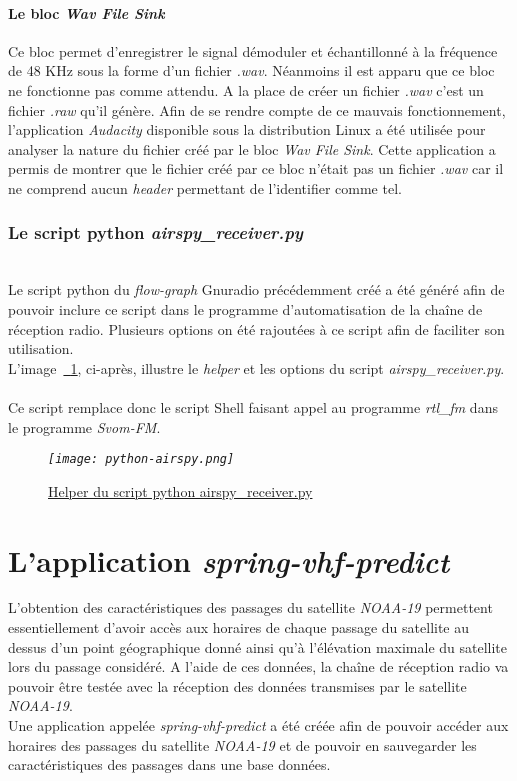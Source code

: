 \documentclass[12pt,fleqn]{book} %
\begin{document}
\subsubsection{Le bloc \emph{Wav File Sink}}
\noindent Ce bloc permet d'enregistrer le signal démoduler et échantillonné à la fréquence de 48 KHz sous la forme d'un fichier \emph{.wav}. Néanmoins il est apparu que ce bloc ne fonctionne pas comme attendu. A la place de créer un fichier \emph{.wav} c'est un fichier \emph{.raw} qu'il génère. Afin de se rendre compte de ce mauvais fonctionnement, l'application \emph{Audacity} disponible sous la distribution Linux a été utilisée pour analyser la nature du fichier créé par le bloc \emph{Wav File Sink}. Cette application a permis de montrer que le fichier créé par ce bloc n'était pas un fichier \emph{.wav} car il ne comprend aucun \emph{header} permettant de l'identifier comme tel.
\subsection{Le script python \emph{airspy\_receiver.py}}
~\\\indent Le script python du \emph{flow-graph} Gnuradio précédemment créé a été généré afin de pouvoir inclure ce script dans le programme d'automatisation de la chaîne de réception radio. Plusieurs options on été rajoutées à ce script afin de faciliter son utilisation.
~\\L'image~\underline{\color{blue}~\ref{python-airspy}}, ci-après, illustre le \emph{helper} et les options du script \emph{airspy\_receiver.py}.
~\\Ce script remplace donc le script Shell faisant appel au programme \emph{rtl\_fm} dans le programme \emph{Svom-FM}.
\begin{figure}[H]
	\centering
	\itshape
	\texttt{[image: python-airspy.png]}
	\caption{\label{python-airspy} \underline{Helper du script python airspy\_receiver.py}}
\end{figure}
\chapter{L'application \emph{spring-vhf-predict}}
L'obtention des caractéristiques des passages du satellite \emph{NOAA-19} permettent essentiellement d'avoir accès aux horaires de chaque passage du satellite au dessus d'un point géographique donné ainsi qu'à l'élévation maximale du satellite lors du passage considéré. A l'aide de ces données, la chaîne de réception radio va pouvoir être testée avec la réception des données transmises par le satellite \emph{NOAA-19}.
~\\ Une application appelée \emph{spring-vhf-predict} a été créée afin de pouvoir accéder aux horaires des passages du satellite \emph{NOAA-19} et de pouvoir en sauvegarder les caractéristiques des passages dans une base données.
\end{document}
